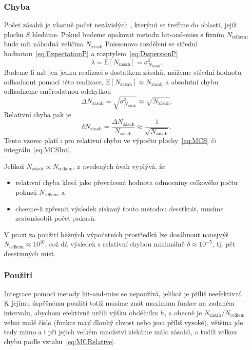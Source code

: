 \documentclass[a4paper,11pt,twoside]{article}
\def\expectation#1{\mathrm{E}\left[#1\right]}
\def\dispersion#1{\sigma_{#1}^{2}}
\theoremstyle{red}
\theoremstyle{green}
\begin{document}
        \subsubsection{Chyba}
            Počet zásahů je vlastně počet nezávislých , kterými se trefíme do oblasti, jejíž plochu $S$ hledáme.
            Pokud budeme opakovat metodu hit-and-miss s fixním $N_{\text{celkem}}$, bude mít náhodná veličina $N_{\text{zásah}}$ Poissonovo rozdělení se střední hodnotou~\eqref{eq:ExpectationP} a rozptylem~\eqref{eq:DispersionP}
            \begin{equation}
                \lambda=\expectation{N_{\text{zásah}}}=\dispersion{N_{\text{zásah}}}.
            \end{equation}
            Budeme-li mít jen jednu realizaci s dostatkem zásahů, můžeme střední hodnotu odhadnout pomocí této realizace, $\expectation{N_{\text{zásah}}}\approx N_{\text{zásah}}$ a absolutní chybu odhadneme směrodatnou odchylkou
            \begin{equation}
                \Delta N_{\text{zásah}}=\sqrt{\dispersion{N_\text{zásah}}}\approx\sqrt{N_{\text{zásah}}}.
            \end{equation}
            Relativní chyba pak je
            \begin{equation}
                \label{eq:MCRelative}
                \delta N_{\text{zásah}}=\frac{\Delta N_{\text{zásah}}}{N_{\text{zásah}}}\approx\frac{1}{\sqrt{N_{\text{zásah}}}}.
            \end{equation}
            Tento vzorec platí i pro relativní chybu ve výpočtu plochy~\eqref{eq:MCS} či integrálu~\eqref{eq:MCSInt}.

            Jelikož $N_{\text{zásah}}\propto N_{\text{celkem}}$, z uvedených úvah vyplývá, že
            \begin{itemize}
                \item relativní chyba klesá jako převrácená hodnota odmocniny celkového počtu pokusů $N_{\text{celkem}}$ a
                \item chceme-li zpřesnit výsledek získaný touto metodou desetkrát, musíme zestonásobit počet pokusů.
            \end{itemize}
            V praxi za použití běžných výpočetních prostředků lze dosáhnout nanejvýš $N_{\text{celkem}}\approx10^{10}$, což dá výsledek s relativní chybou minimálně $\delta\approx10^{-5}$, tj. pět desetinných míst.

        \subsubsection{Použití}
            Integrace pomocí metody hit-and-miss se nepoužívá, jelikož je příliš neefektivní. 
            K jejímu úspěšnému použití totiž musíme znát maximum funkce na zadaném intervalu, abychom efektivně určili výšku obdélníku $h$, a obecně je $N_{\text{zásah}}/N_{\text{celkem}}$ velmi malé číslo (funkce mají dlouhý chvost nebo jsou příliš vysoké), většina  jde tedy mimo a i při jejich velkém množství získáme málo zásahů, a tudíž velkou chybu podle vztahu~\eqref{eq:MCRelative}.
\end{document}
